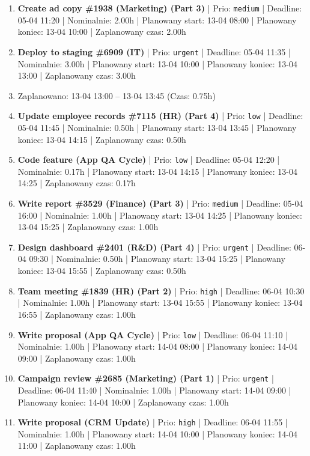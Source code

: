 {\begin{enumerate}
  \item [\textbf{14652}] \textbf{Create ad copy \#1938 (Marketing) (Part 3)} | Prio: \texttt{medium} | Deadline: 05-04 11:20 | Nominalnie: 2.00h | Planowany start: 13-04 08:00 | Planowany koniec: 13-04 10:00 | Zaplanowany czas: 2.00h
  \item [\textbf{14597}] \textbf{Deploy to staging \#6909 (IT)} | Prio: \texttt{urgent} | Deadline: 05-04 11:35 | Nominalnie: 3.00h | Planowany start: 13-04 10:00 | Planowany koniec: 13-04 13:00 | Zaplanowany czas: 3.00h
  \item [\textbf{PRZERWA}] Zaplanowano: 13-04 13:00 -- 13-04 13:45 (Czas: 0.75h)
  \item [\textbf{14701}] \textbf{Update employee records \#7115 (HR) (Part 4)} | Prio: \texttt{low} | Deadline: 05-04 11:45 | Nominalnie: 0.50h | Planowany start: 13-04 13:45 | Planowany koniec: 13-04 14:15 | Zaplanowany czas: 0.50h
  \item [\textbf{14703}] \textbf{Code feature (App QA Cycle)} | Prio: \texttt{low} | Deadline: 05-04 12:20 | Nominalnie: 0.17h | Planowany start: 13-04 14:15 | Planowany koniec: 13-04 14:25 | Zaplanowany czas: 0.17h
  \item [\textbf{14672}] \textbf{Write report \#3529 (Finance) (Part 3)} | Prio: \texttt{medium} | Deadline: 05-04 16:00 | Nominalnie: 1.00h | Planowany start: 13-04 14:25 | Planowany koniec: 13-04 15:25 | Zaplanowany czas: 1.00h
  \item [\textbf{14603}] \textbf{Design dashboard \#2401 (R\&D) (Part 4)} | Prio: \texttt{urgent} | Deadline: 06-04 09:30 | Nominalnie: 0.50h | Planowany start: 13-04 15:25 | Planowany koniec: 13-04 15:55 | Zaplanowany czas: 0.50h
  \item [\textbf{14610}] \textbf{Team meeting \#1839 (HR) (Part 2)} | Prio: \texttt{high} | Deadline: 06-04 10:30 | Nominalnie: 1.00h | Planowany start: 13-04 15:55 | Planowany koniec: 13-04 16:55 | Zaplanowany czas: 1.00h
  \item [\textbf{14695}] \textbf{Write proposal (App QA Cycle)} | Prio: \texttt{low} | Deadline: 06-04 11:10 | Nominalnie: 1.00h | Planowany start: 14-04 08:00 | Planowany koniec: 14-04 09:00 | Zaplanowany czas: 1.00h
  \item [\textbf{14607}] \textbf{Campaign review \#2685 (Marketing) (Part 1)} | Prio: \texttt{urgent} | Deadline: 06-04 11:40 | Nominalnie: 1.00h | Planowany start: 14-04 09:00 | Planowany koniec: 14-04 10:00 | Zaplanowany czas: 1.00h
  \item [\textbf{14629}] \textbf{Write proposal (CRM Update)} | Prio: \texttt{high} | Deadline: 06-04 11:55 | Nominalnie: 1.00h | Planowany start: 14-04 10:00 | Planowany koniec: 14-04 11:00 | Zaplanowany czas: 1.00h

\end{enumerate}}
